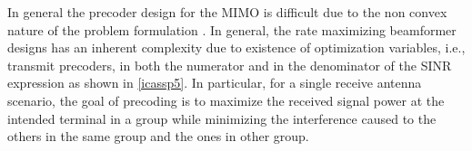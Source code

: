 \documentclass{article}
\begin{document}
In general the precoder design for the \ac{MIMO} is difficult due to the non convex nature of the problem formulation \cite{luo2008dynamic}. In general, the rate maximizing beamformer designs has an inherent complexity due to existence of optimization variables, i.e., transmit precoders, in both the numerator and in the denominator of the \ac{SINR} expression as shown in \eqref{icassp5}. %
In particular, for a single receive antenna scenario, the goal of precoding is to maximize the received signal power at the intended terminal in a group while minimizing the interference caused to the others in the same group and the ones in other group.

\end{document}
